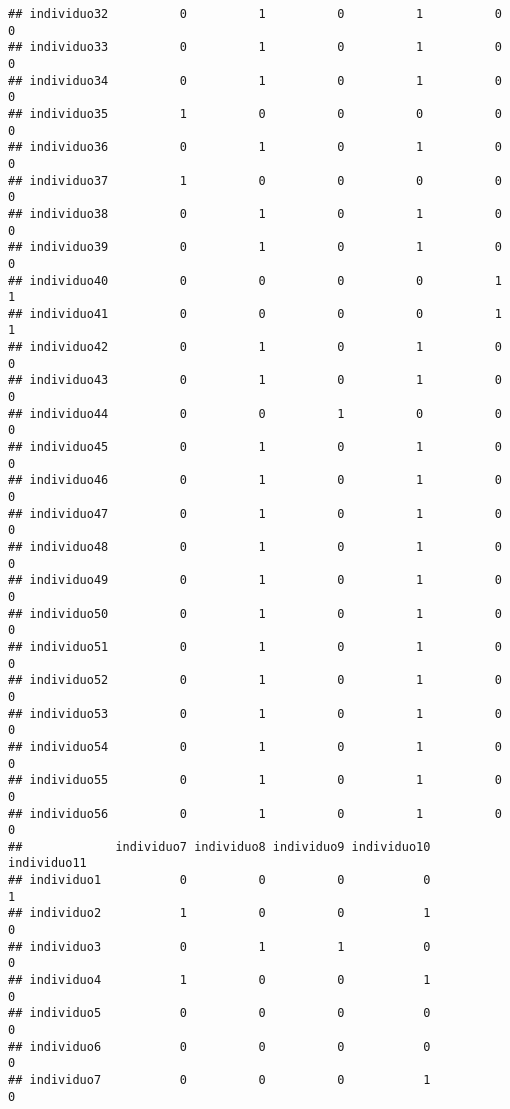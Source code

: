 \documentclass[
]{article}
\begin{document}
\begin{verbatim}
## individuo32          0          1          0          1          0          0
## individuo33          0          1          0          1          0          0
## individuo34          0          1          0          1          0          0
## individuo35          1          0          0          0          0          0
## individuo36          0          1          0          1          0          0
## individuo37          1          0          0          0          0          0
## individuo38          0          1          0          1          0          0
## individuo39          0          1          0          1          0          0
## individuo40          0          0          0          0          1          1
## individuo41          0          0          0          0          1          1
## individuo42          0          1          0          1          0          0
## individuo43          0          1          0          1          0          0
## individuo44          0          0          1          0          0          0
## individuo45          0          1          0          1          0          0
## individuo46          0          1          0          1          0          0
## individuo47          0          1          0          1          0          0
## individuo48          0          1          0          1          0          0
## individuo49          0          1          0          1          0          0
## individuo50          0          1          0          1          0          0
## individuo51          0          1          0          1          0          0
## individuo52          0          1          0          1          0          0
## individuo53          0          1          0          1          0          0
## individuo54          0          1          0          1          0          0
## individuo55          0          1          0          1          0          0
## individuo56          0          1          0          1          0          0
##             individuo7 individuo8 individuo9 individuo10 individuo11
## individuo1           0          0          0           0           1
## individuo2           1          0          0           1           0
## individuo3           0          1          1           0           0
## individuo4           1          0          0           1           0
## individuo5           0          0          0           0           0
## individuo6           0          0          0           0           0
## individuo7           0          0          0           1           0

\end{verbatim}
\end{document}
